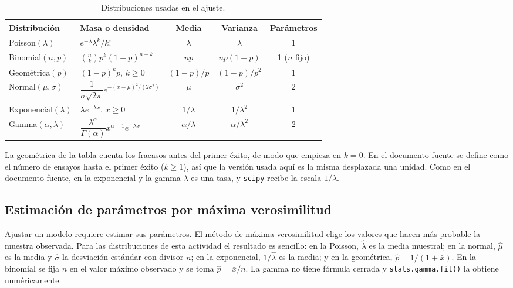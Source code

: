 \documentclass[11pt,letterpaper]{article}
\begin{document}
\begin{table}[htbp]
\centering
\caption{Distribuciones usadas en el ajuste.}
\label{tab:resumen}
\small
\renewcommand{\arraystretch}{1.6}
\begin{tabular}{llccc}
\hline
\textbf{Distribución} & \textbf{Masa o densidad} & \textbf{Media} & \textbf{Varianza} & \textbf{Parámetros} \\
\hline
Poisson$(\lambda)$ & $e^{-\lambda}\lambda^k/k!$ & $\lambda$ & $\lambda$ & 1 \\
Binomial$(n, p)$ & $\binom{n}{k}p^k(1-p)^{n-k}$ & $np$ & $np(1-p)$ & 1 ($n$ fijo) \\
Geométrica$(p)$ & $(1-p)^{k}p$, \; $k \ge 0$ & $(1-p)/p$ & $(1-p)/p^2$ & 1 \\
Normal$(\mu, \sigma)$ & $\dfrac{1}{\sigma\sqrt{2\pi}}e^{-(x-\mu)^2/(2\sigma^2)}$ & $\mu$ & $\sigma^2$ & 2 \\
Exponencial$(\lambda)$ & $\lambda e^{-\lambda x}$, \; $x \ge 0$ & $1/\lambda$ & $1/\lambda^2$ & 1 \\
Gamma$(\alpha, \lambda)$ & $\dfrac{\lambda^\alpha}{\Gamma(\alpha)}x^{\alpha-1}e^{-\lambda x}$ & $\alpha/\lambda$ & $\alpha/\lambda^2$ & 2 \\
\hline
\end{tabular}
\end{table}

La geométrica de la tabla cuenta los fracasos antes del primer éxito, de modo que empieza en $k = 0$. En el documento fuente se define como el número de ensayos hasta el primer éxito ($k \ge 1$), así que la versión usada aquí es la misma desplazada una unidad. Como en el documento fuente, en la exponencial y la gamma $\lambda$ es una tasa, y \texttt{scipy} recibe la escala $1/\lambda$.

\subsection{Estimación de parámetros por máxima verosimilitud}

Ajustar un modelo requiere estimar sus parámetros. El método de máxima verosimilitud elige los valores que hacen más probable la muestra observada. Para las distribuciones de esta actividad el resultado es sencillo: en la Poisson, $\hat\lambda$ es la media muestral; en la normal, $\hat\mu$ es la media y $\hat\sigma$ la desviación estándar con divisor $n$; en la exponencial, $1/\hat\lambda$ es la media; y en la geométrica, $\hat p = 1/(1 + \bar{x})$. En la binomial se fija $n$ en el valor máximo observado y se toma $\hat p = \bar{x}/n$. La gamma no tiene fórmula cerrada y \texttt{stats.gamma.fit()} la obtiene numéricamente.
\end{document}
